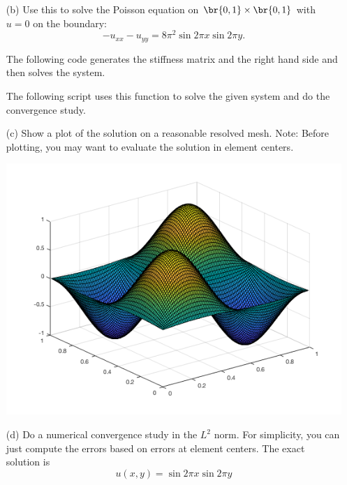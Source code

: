 \documentclass[11pt, titlepage]{article}
\begin{document}
\begin{enumerate}
\begin{enumerate}
      \item[(b)]
        Use this to solve the Poisson equation on $\br{0, 1} \times \br{0, 1}$
        with $u = 0$ on the boundary:
        \[
          -u_{xx} - u_{yy} = 8\pi^2 \sin{2\pi x} \sin{2\pi y}.
        \]

        The following code generates the stiffness matrix and the right hand
        side and then solves the system.
        
        The following script uses this function to solve the given system and
        do the convergence study.
        

      \item[(c)]
        Show a plot of the solution on a reasonable resolved mesh.
        Note: Before plotting, you may want to evaluate the solution in element
        centers.

        \begin{center}
          \includegraphics[scale=.5]{Figures/03_01}
        \end{center}

      \item[(d)]
        Do a numerical convergence study in the $L^2$ norm.
        For simplicity, you can just compute the errors based on errors at
        element centers.
        The exact solution is
        \[
          u(x, y) = \sin{2 \pi x} \sin{2 \pi y}
        \]


\end{enumerate}
\end{enumerate}
\end{document}
